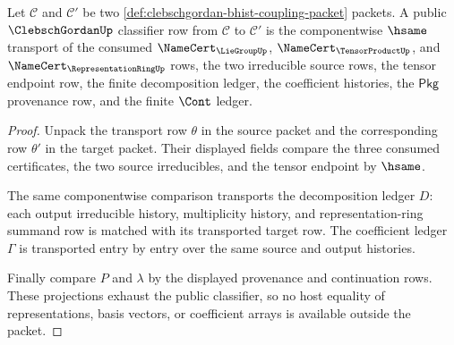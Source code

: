 \begin{theorem}
\label{thm:clebschgordan-classifier-transport-obligation}
Let $\mathcal{C}$ and $\mathcal{C}'$ be two
\autoref{def:clebschgordan-bhist-coupling-packet} packets. A public
$\ClebschGordanUp$ classifier row from $\mathcal{C}$ to $\mathcal{C}'$ is the
componentwise $\hsame$ transport of the consumed
$\NameCert_{\LieGroupUp}$, $\NameCert_{\TensorProductUp}$, and
$\NameCert_{\RepresentationRingUp}$ rows, the two irreducible source rows, the
tensor endpoint row, the finite decomposition ledger, the coefficient
histories, the $\mathsf{Pkg}$ provenance row, and the finite $\Cont$ ledger.
\end{theorem}
\begin{proof}
Unpack the transport row $\theta$ in the source packet and the corresponding
row $\theta'$ in the target packet. Their displayed fields compare the three
consumed certificates, the two source irreducibles, and the tensor endpoint
by $\hsame$.

The same componentwise comparison transports the decomposition ledger $D$:
each output irreducible history, multiplicity history, and
representation-ring summand row is matched with its transported target row.
The coefficient ledger $\Gamma$ is transported entry by entry over the same
source and output histories.

Finally compare $P$ and $\lambda$ by the displayed provenance and continuation
rows. These projections exhaust the public classifier, so no host equality of
representations, basis vectors, or coefficient arrays is available outside
the packet.
\end{proof}

